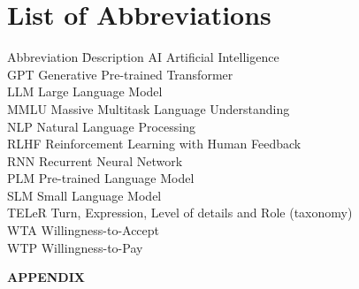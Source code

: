 \documentclass[12pt, a4paper, titlepage]{article}
\begin{document}
\newpage
\tableofcontents

\newpage
\section*{List of Abbreviations}
\begin{tabbing}
    Abbreviation \hspace{1cm} \= Description \kill
    AI \> Artificial Intelligence \\
    GPT \> Generative Pre-trained Transformer \\
    LLM \> Large Language Model \\
    MMLU \> Massive Multitask Language Understanding \\
    NLP \> Natural Language Processing \\
    RLHF \> Reinforcement Learning with Human Feedback \\
    RNN \> Recurrent Neural Network \\
    PLM \> Pre-trained Language Model \\
    SLM \> Small Language Model \\
    TELeR \> Turn, Expression, Level of details and Role (taxonomy) \\
    WTA \> Willingness-to-Accept \\
    WTP \> Willingness-to-Pay \\
\end{tabbing}

\newpage
\listoftables
{}

\newpage
\listoffigures
{}


\clearpage
{} %


\vspace{0.5cm}






\clearpage
{} %
\setcounter{page}{7}
\printbibliography

\newpage
\thispagestyle{empty}
\begin{center}
  \vspace*{\fill}
  {\Huge\textbf{APPENDIX}}
  \vspace*{\fill}
\end{center}
\newpage
\setcounter{page}{11}

\end{document}
